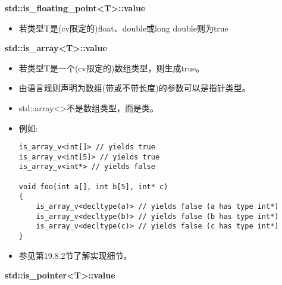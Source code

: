 \textbf{std::is\_floating\_point<T>::value}

\begin{itemize}
\item 
若类型T是(cv限定的)float、double或long double则为true
\end{itemize}

\textbf{std::is\_array<T>::value}

\begin{itemize}
\item 
若类型T是一个(cv限定的)数组类型，则生成true。

\item 
由语言规则声明为数组(带或不带长度)的参数可以是指针类型。

\item 
std::array<>不是数组类型，而是类。

\item 
例如:

\begin{lstlisting}[style=styleCXX]
is_array_v<int[]> // yields true
is_array_v<int[5]> // yields true
is_array_v<int*> // yields false

void foo(int a[], int b[5], int* c)
{
	is_array_v<decltype(a)> // yields false (a has type int*)
	is_array_v<decltype(b)> // yields false (b has type int*)
	is_array_v<decltype(c)> // yields false (c has type int*)
}
\end{lstlisting}

\item 
参见第19.8.2节了解实现细节。
\end{itemize}

\textbf{std::is\_pointer<T>::value}

